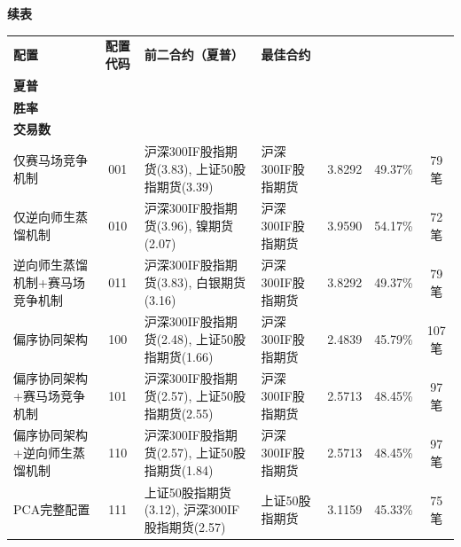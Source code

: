 \begin{table}[H]
\centering
{\small\textbf{续表}}\\[0.5em]
\scriptsize
\setlength{\tabcolsep}{3pt}
\renewcommand{\arraystretch}{1.18}
\begin{tabular}{p{2.6cm}cp{4.0cm}p{2.4cm}ccc}
\toprule
\textbf{配置} & \textbf{配置代码} & \textbf{前二合约（夏普）} & \textbf{最佳合约} & \makecell{\textbf{最佳合约}\\\textbf{夏普}} & \makecell{\textbf{最佳合约}\\\textbf{胜率}} & \makecell{\textbf{最佳合约}\\\textbf{交易数}} \\
\midrule
仅赛马场竞争机制 & 001 & 沪深300IF股指期货(3.83), 上证50股指期货(3.39) & 沪深300IF股指期货 & 3.8292 & 49.37\% & 79笔 \\
仅逆向师生蒸馏机制 & 010 & 沪深300IF股指期货(3.96), 镍期货(2.07) & 沪深300IF股指期货 & 3.9590 & 54.17\% & 72笔 \\
逆向师生蒸馏机制+赛马场竞争机制 & 011 & 沪深300IF股指期货(3.83), 白银期货(3.16) & 沪深300IF股指期货 & 3.8292 & 49.37\% & 79笔 \\
偏序协同架构 & 100 & 沪深300IF股指期货(2.48), 上证50股指期货(1.66) & 沪深300IF股指期货 & 2.4839 & 45.79\% & 107笔 \\
偏序协同架构+赛马场竞争机制 & 101 & 沪深300IF股指期货(2.57), 上证50股指期货(2.55) & 沪深300IF股指期货 & 2.5713 & 48.45\% & 97笔 \\
偏序协同架构+逆向师生蒸馏机制 & 110 & 沪深300IF股指期货(2.57), 上证50股指期货(1.84) & 沪深300IF股指期货 & 2.5713 & 48.45\% & 97笔 \\
PCA完整配置 & 111 & 上证50股指期货(3.12), 沪深300IF股指期货(2.57) & 上证50股指期货 & 3.1159 & 45.33\% & 75笔 \\
\bottomrule
\end{tabular}
\end{table}

